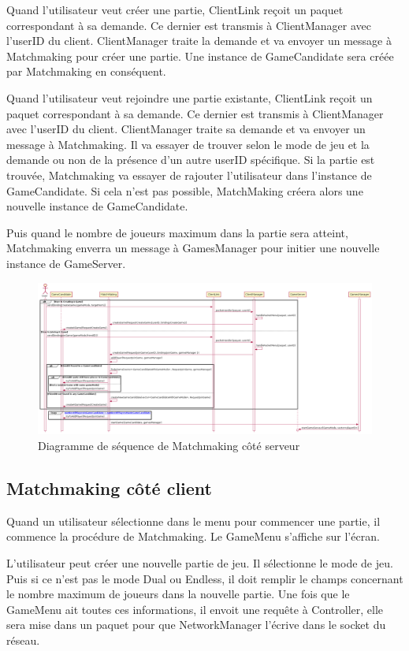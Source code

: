 \documentclass{article}
\begin{document}
Quand l'utilisateur veut créer une partie, ClientLink reçoit un paquet correspondant à sa demande. Ce dernier est transmis à ClientManager avec l'userID du client. ClientManager traite la demande et va envoyer un message à Matchmaking pour créer une partie. Une instance de GameCandidate sera créée par Matchmaking en conséquent. 

Quand l'utilisateur veut rejoindre une partie existante, ClientLink reçoit un paquet correspondant à sa demande. Ce dernier est transmis à ClientManager avec l'userID du client. ClientManager traite sa demande et va envoyer un message à Matchmaking. Il va essayer de trouver selon le mode de jeu et la demande ou non de la présence d'un autre userID spécifique. Si la partie est trouvée, Matchmaking va essayer de rajouter l'utilisateur dans l'instance de GameCandidate. Si cela n'est pas possible, MatchMaking créera alors une nouvelle instance de GameCandidate. 

Puis quand le nombre de joueurs maximum dans la partie sera atteint, Matchmaking enverra un message à GamesManager pour initier une nouvelle instance de GameServer.

\begin{figure}[H]
    \centering
    \includegraphics[width=1\textwidth]{../res/uml/sequence/MatchMakingServerSequence.png}
    \caption{Diagramme de séquence de Matchmaking côté serveur}
    \label{fig:MatchmakingServerDiagram}
\end{figure}

\subsection{Matchmaking côté client}

Quand un utilisateur sélectionne dans le menu pour commencer une partie, il commence la procédure de Matchmaking. Le GameMenu s'affiche sur l'écran.

L'utilisateur peut créer une nouvelle partie de jeu. Il sélectionne le mode de jeu. Puis si ce n'est pas le mode Dual ou Endless, il doit remplir le champs concernant le nombre maximum de joueurs dans la nouvelle partie. Une fois que le GameMenu ait toutes ces informations, il envoit une requête à Controller, elle sera mise dans un paquet pour que NetworkManager l'écrive dans le socket du réseau. 
\end{document}
